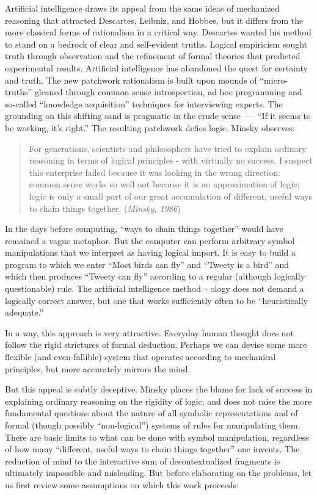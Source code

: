 \documentclass[12pt]{article}
\def\bq{\begin{quote}}
\def\eq{\end{quote}}
\begin{document}
Artificial intelligence draws its appeal from the same ideas of mechanized reasoning that attracted Descartes, Leibniz, and Hobbes, but it differs from the more classical forms of rationalism in a critical way. Descartes wanted his method to stand on a bedrock of clear and self-evident truths. Logical empiricism sought truth through observation and the refinement of formal theories that predicted experimental results. Artificial intelligence has abandoned the quest for certainty and truth. The new patchwork rationalism is built upon mounds of ``micro-truths'' gleaned through common sense introspection, ad hoc programming and so-called ``knowledge acquisition'' techniques for interviewing experts. The grounding on this shifting sand is pragmatic in the crude sense~---~``If it seems to be working, it’s right.'' The resulting patchwork defies logic. Minsky observes:

\bq
For generations, scientists and philosophers have tried to explain ordinary reasoning in terms of logical principles - with virtually no success. I suspect this enterprise failed because it was looking in the wrong direction: common sense works so well not because it is an approximation of logic; logic is only a small part of our great accumulation of different, useful ways to chain things together. ({\it Minsky, 1986})
\eq

In the days before computing, ``ways to chain things together'' would have remained a vague metaphor. But the computer can perform arbitrary symbol manipulations that we interpret as having logical import. It is easy to build a program to which we enter ``Most birds can fly'' and ``Tweety is a bird'' and which then produces ``Tweety can fly'' according to a regular (although logically questionable) rule. The artificial intelligence method¬ ology does not demand a logically correct answer, but one that works sufficiently often to be ``heuristically adequate.''

In a way, this approach is very attractive. Everyday human thought does not follow the rigid strictures of formal deduction. Perhaps we can devise some more flexible (and even fallible) system that operates according to mechanical principles, but more accurately mirrors the mind.

But this appeal is subtly deceptive. Minsky places the blame for lack of success in explaining ordinary reasoning on the rigidity of logic, and does not raise the more fundamental questions about the nature of all symbolic representations and of formal (though possibly ``non-logical'') systems of rules for manipulating them. There are basic limits to what can be done with symbol manipulation, regardless of how many ``different, useful ways to chain things together'' one invents. The reduction of mind to the interactive sum of decontextualized fragments is ultimately impossible and misleading. But before elaborating on the problems, let us first review some assumptions on which this work proceeds:
\end{document}
